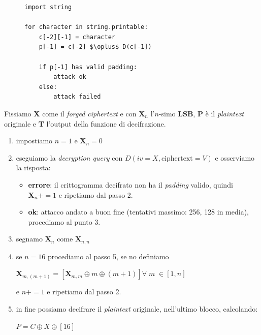 \begin{figure}[h]
    \begin{lstlisting}[mathescape=true]
import string

for character in string.printable:
    c[-2][-1] = character
    p[-1] = c[-2] $\oplus$ D(c[-1])

    if p[-1] has valid padding:
        attack ok
    else:
        attack failed
        \end{lstlisting}
        \label{lst:padding_oracle}
\end{figure}

\begin{boxA}
    Fissiamo \textbf{X} come il \textit{forged ciphertext} e con $\mathbf{X}_n$ l'$n$-simo \textbf{LSB}, \textbf{P} è il \textit{plaintext} originale e \textbf{T} l'output della funzione di decifrazione.
    \begin{enumerate}[nosep]
        \item impostiamo $n=1$ e $\mathbf{X}_n = 0$
        \item eseguiamo la \textit{decryption query} con $D(iv=X, \text{ciphertext}=V)$ e osserviamo la risposta:
        \begin{itemize}[nosep]
            \item \textbf{errore}: il crittogramma decifrato non ha il \textit{padding} valido, quindi $\mathbf{X}_n += 1$ e ripetiamo dal passo 2.
            \item \textbf{ok}: attacco andato a buon fine (tentativi massimo: 256, 128 in media), procediamo al punto 3.
        \end{itemize}
        \item segnamo $\mathbf{X}_n$ come $\mathbf{X}_{n,n}$
        \item se $n=16$ procediamo al passo 5, se no definiamo 
        
        {\centering
            $\mathbf{X}_{m, (m+1)} = [\mathbf{X}_{m,m} \oplus m \oplus (m+1)] \forall \; m \; \in [1, n]$
        \par}
        
        e $n += 1$ e ripetiamo dal passo 2.
        \item in fine possiamo decifrare il \textit{plaintext} originale, nell'ultimo blocco, calcolando:
        
        {\centering
            $P = C \oplus X \oplus [16]$
        \par}


\end{enumerate}
\end{boxA}
